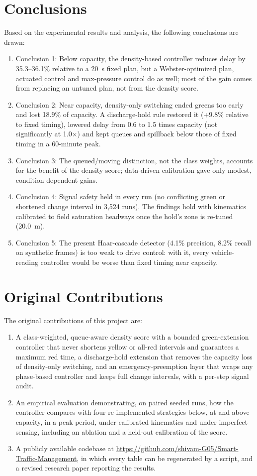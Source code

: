 \section{Conclusions}
Based on the experimental results and analysis, the following conclusions are drawn:
\begin{enumerate}
  \item Conclusion 1: Below capacity, the density-based controller reduces delay by 35.3--36.1\% relative to a 20~s fixed plan, but a Webster-optimized plan, actuated control and max-pressure control do as well; most of the gain comes from replacing an untuned plan, not from the density score.
  \item Conclusion 2: Near capacity, density-only switching ended greens too early and lost 18.9\% of capacity. A discharge-hold rule restored it (+9.8\% relative to fixed timing), lowered delay from 0.6 to 1.5 times capacity (not significantly at 1.0$\times$) and kept queues and spillback below those of fixed timing in a 60-minute peak.
  \item Conclusion 3: The queued/moving distinction, not the class weights, accounts for the benefit of the density score; data-driven calibration gave only modest, condition-dependent gains.
  \item Conclusion 4: Signal safety held in every run (no conflicting green or shortened change interval in 3,524 runs). The findings hold with kinematics calibrated to field saturation headways once the hold's zone is re-tuned (20.0~m).
  \item Conclusion 5: The present Haar-cascade detector (4.1\% precision, 8.2\% recall on synthetic frames) is too weak to drive control: with it, every vehicle-reading controller would be worse than fixed timing near capacity.
\end{enumerate}

\section{Original Contributions}
\label{sec:contrib}
The original contributions of this project are:
\begin{enumerate}
  \item A class-weighted, queue-aware density score with a bounded green-extension controller that never shortens yellow or all-red intervals and guarantees a maximum red time, a discharge-hold extension that removes the capacity loss of density-only switching, and an emergency-preemption layer that wraps any phase-based controller and keeps full change intervals, with a per-step signal audit.
  \item An empirical evaluation demonstrating, on paired seeded runs, how the controller compares with four re-implemented strategies below, at and above capacity, in a peak period, under calibrated kinematics and under imperfect sensing, including an ablation and a held-out calibration of the score.
  \item A publicly available codebase at \url{https://github.com/shivam-G05/Smart-Traffic-Management}, in which every table can be regenerated by a script, and a revised research paper reporting the results.
\end{enumerate}

